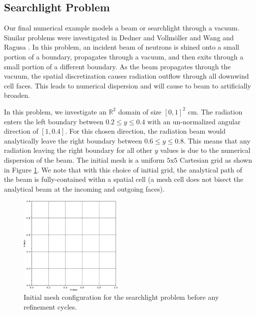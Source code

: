 \subsection{Searchlight Problem}
\label{sec::BF_Results_SL}

Our final numerical example models a beam or searchlight through a vacuum. Similar problems were investigated in Dedner and Vollm{\"o}ller \cite{dedner2002adaptive} and Wang and Ragusa \cite{wang2011standard}. In this problem, an incident beam of neutrons is shined onto a small portion of a boundary, propagates through a vacuum, and then exits through a small portion of a different boundary. As the beam propagates through the vacuum, the spatial discretization causes radiation outflow through all downwind cell faces. This leads to numerical dispersion and will cause to beam to artificially broaden.

In this problem, we investigate an $\mathbb{R}^2$ domain of size $[0,1]^2$ cm. The radiation enters the left boundary between $0.2 \leq y \leq 0.4$ with an un-normalized angular direction of $[1,0.4]$. For this chosen direction, the radiation beam would analytically leave the right boundary between $0.6 \leq y \leq 0.8$. This means that any radiation leaving the right boundary for all other $y$ values is due to the numerical dispersion of the beam. The initial mesh is a uniform $5 \text{x} 5$ Cartesian grid as shown in Figure \ref{fig::BF_Results_SL_starting_mesh}. We note that with this choice of initial grid, the analytical path of the beam is fully-contained withn a spatial cell (a mesh cell does not bisect the analytical beam at the incoming and outgoing faces). 

\begin{figure}
\centering
\includegraphics[width=0.45\textwidth]{figures/sec_BF/searchlight_starting_mesh.eps}
\caption{Initial mesh configuration for the searchlight problem before any refinement cycles.}
\label{fig::BF_Results_SL_starting_mesh}
\end{figure}

